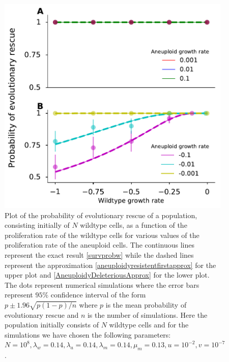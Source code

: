\documentclass[12pt]{extarticle}
\begin{document}
\begin{figure}[!h]
 \vspace*{1\baselineskip}
\includegraphics[width=1\textwidth]{Figures/CombinedSubplotLargePop.pdf}
\caption{Plot of the probability of evolutionary rescue of a population, consisting initially of $N$ wildtype cells, as a function of the proliferation rate of the wildtype cells for various values of the proliferation rate of the aneuploid cells. The continuous lines represent the exact result \eqref{survprobw} while the dashed lines represent the approximation \eqref{aneuploidyresistentfirstapprox} for the upper plot and \eqref{AneuploidyDeleteriousApprox} for the lower plot. The dots represent numerical simulations where the error bars represent $95\%$ confidence interval of the form $p\pm1.96\sqrt{p\left(1-p\right)/n}$ where $p$ is the mean probability of evolutionary rescue and $n$ is the number of simulations.  Here the population initially consists of $N$ wildtype cells and for the simulations we have chosen the following parameters: $N=10^8, \lambda_w=0.14, \lambda_a=0.14,\lambda_m=0.14,\mu_m=0.13, u=10^{-2}, v=10^{-7}$. }
\label{SurvPlotLargeN}
\end{figure}
\end{document}
